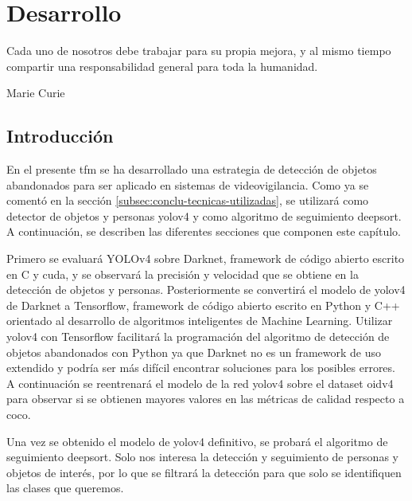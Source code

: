 
\chapter{Desarrollo}
\label{cha:desarrollo}

\begin{FraseCelebre}
  \begin{Frase}
    Cada uno de nosotros debe trabajar para su propia mejora, y al mismo tiempo compartir una responsabilidad general para toda la humanidad.
  \end{Frase}
  \begin{Fuente}
    Marie Curie
  \end{Fuente}
\end{FraseCelebre}

\section{Introducción}
\label{sec:intro-desarrollo}

En el presente \gls{tfm} se ha desarrollado una estrategia de detección de objetos abandonados para ser aplicado en sistemas de videovigilancia. Como ya se comentó en la sección \ref{subsec:conclu-tecnicas-utilizadas}, se utilizará como detector de objetos y personas \gls{yolov4} y como algoritmo de seguimiento \gls{deepsort}. A continuación, se describen las diferentes secciones que componen este capítulo.

Primero se evaluará YOLOv4 sobre Darknet, framework de código abierto escrito en C y \gls{cuda}, y se observará la precisión y velocidad que se obtiene en la detección de objetos y personas. Posteriormente se convertirá el modelo de \gls{yolov4} de Darknet a Tensorflow, framework de código abierto escrito en Python y C++ orientado al desarrollo de algoritmos inteligentes de Machine Learning. Utilizar \gls{yolov4} con Tensorflow facilitará la programación del algoritmo de detección de objetos abandonados con Python ya que Darknet no es un framework de uso extendido y podría ser más difícil encontrar soluciones para los posibles errores. A continuación se reentrenará el modelo de la red \gls{yolov4} sobre el dataset \gls{oidv4} para observar si se obtienen mayores valores en las métricas de calidad respecto a \gls{coco}.

Una vez se obtenido el modelo de \gls{yolov4} definitivo, se probará el algoritmo de seguimiento \gls{deepsort}. Solo nos interesa la detección y seguimiento de personas y objetos de interés, por lo que se filtrará la detección para que solo se identifiquen las clases que queremos.

